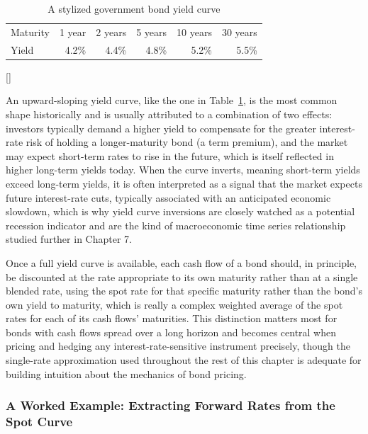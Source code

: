 \documentclass[../ai_in_finance]{subfiles}
\begin{document}
\begin{table}[htbp]
\centering
\begin{lrbox}{\bookmeasuredbox}
\begin{tabular}{lrrrrr}
\toprule
Maturity & 1 year & 2 years & 5 years & 10 years & 30 years \\
Yield & 4.2\% & 4.4\% & 4.8\% & 5.2\% & 5.5\% \\
\bottomrule
\end{tabular}
\end{lrbox}
\ifdim\wd\bookmeasuredbox<0.65\linewidth
\setlength{\bookcapwidth}{0.65\linewidth}
\else
\setlength{\bookcapwidth}{\wd\bookmeasuredbox}
\fi
{}[\bookcapwidth]{
\usebox{\bookmeasuredbox}
}{
\caption{A stylized government bond yield curve}
\label{tab:yield_curve}
}
\end{table}

An upward-sloping yield curve, like the one in Table~\ref{tab:yield_curve}, is the most common shape historically and is usually attributed to a combination of two effects: investors typically demand a higher yield to compensate for the greater interest-rate risk of holding a longer-maturity bond (a term premium), and the market may expect short-term rates to rise in the future, which is itself reflected in higher long-term yields today. When the curve inverts, meaning short-term yields exceed long-term yields, it is often interpreted as a signal that the market expects future interest-rate cuts, typically associated with an anticipated economic slowdown, which is why yield curve inversions are closely watched as a potential recession indicator and are the kind of macroeconomic time series relationship studied further in Chapter 7.

Once a full yield curve is available, each cash flow of a bond should, in principle, be discounted at the rate appropriate to its own maturity rather than at a single blended rate, using the spot rate for that specific maturity rather than the bond's own yield to maturity, which is really a complex weighted average of the spot rates for each of its cash flows' maturities. This distinction matters most for bonds with cash flows spread over a long horizon and becomes central when pricing and hedging any interest-rate-sensitive instrument precisely, though the single-rate approximation used throughout the rest of this chapter is adequate for building intuition about the mechanics of bond pricing.

\subsubsection*{A Worked Example: Extracting Forward Rates from the Spot Curve}
\end{document}
